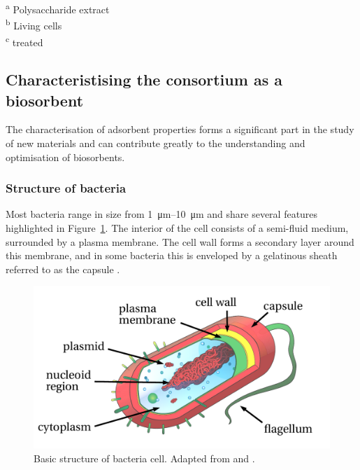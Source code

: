 \begin{table}[htbp!]
\begin{small}
\begin{minipage}{\textwidth}
\begin{tabularx}{\textwidth}{>{\raggedright\arraybackslash}X>{\centering\arraybackslash\hsize = 0.5\hsize}XX}
		\bottomrule
	\end{tabularx}

	\vspace{1em}
	
	\textsuperscript{a} Polysaccharide extract \\
	\textsuperscript{b} Living cells \\
	\textsuperscript{c}  treated
\end{minipage}
\end{small}
\end{table}

\subsection{Characteristising the consortium as a biosorbent}

The characterisation of adsorbent properties forms a significant part in the study of new materials and can contribute greatly to the understanding and optimisation of biosorbents.

\subsubsection{Structure of bacteria}

Most bacteria range in size from \SIrange[range-units = single]{1}{10}{\micro\meter} and share several features highlighted in Figure~\ref{fig:bacteria}. The interior of the cell consists of a semi-fluid medium, surrounded by a plasma membrane. The cell wall forms a secondary layer around this membrane, and in some bacteria this is enveloped by a gelatinous sheath referred to as the capsule \parencite{Mader1998}.

\begin{figure}[tbph!]
	\centering
	\includegraphics[width=0.8\linewidth]{Theory/Pics/bacteria}
	\caption{Basic structure of bacteria cell. Adapted from \textcite{Villarreal2008} and \textcite{Mader1998}.}
	\label{fig:bacteria}
\end{figure}



